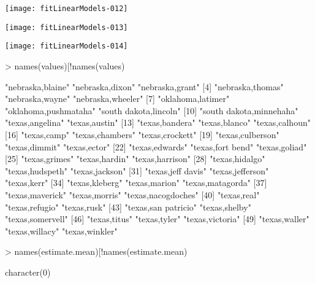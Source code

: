 \documentclass{report}
\begin{document}
\texttt{[image: fitLinearModels-012]}

\texttt{[image: fitLinearModels-013]}

\texttt{[image: fitLinearModels-014]}

\begin{Schunk}
\begin{Sinput}
> names(values)[!names(values)%in%names(estimate.mean)]
\end{Sinput}
\begin{Soutput}
 [1] "nebraska,blaine"        "nebraska,dixon"         "nebraska,grant"        
 [4] "nebraska,thomas"        "nebraska,wayne"         "nebraska,wheeler"      
 [7] "oklahoma,latimer"       "oklahoma,pushmataha"    "south dakota,lincoln"  
[10] "south dakota,minnehaha" "texas,angelina"         "texas,austin"          
[13] "texas,bandera"          "texas,blanco"           "texas,calhoun"         
[16] "texas,camp"             "texas,chambers"         "texas,crockett"        
[19] "texas,culberson"        "texas,dimmit"           "texas,ector"           
[22] "texas,edwards"          "texas,fort bend"        "texas,goliad"          
[25] "texas,grimes"           "texas,hardin"           "texas,harrison"        
[28] "texas,hidalgo"          "texas,hudspeth"         "texas,jackson"         
[31] "texas,jeff davis"       "texas,jefferson"        "texas,kerr"            
[34] "texas,kleberg"          "texas,marion"           "texas,matagorda"       
[37] "texas,maverick"         "texas,morris"           "texas,nacogdoches"     
[40] "texas,real"             "texas,refugio"          "texas,rusk"            
[43] "texas,san patricio"     "texas,shelby"           "texas,somervell"       
[46] "texas,titus"            "texas,tyler"            "texas,victoria"        
[49] "texas,waller"           "texas,willacy"          "texas,winkler"         
\end{Soutput}
\begin{Sinput}
> names(estimate.mean)[!names(estimate.mean)%in%names(values)]
\end{Sinput}
\begin{Soutput}
character(0)
\end{Soutput}
\end{Schunk}
\end{document}
